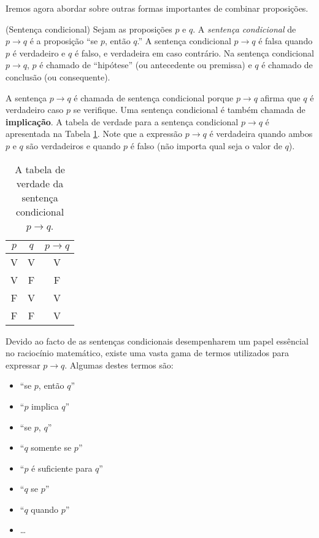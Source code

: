 Iremos agora abordar sobre outras formas importantes de combinar proposições.

\label{def15}
\begin{defn}
(Sentença condicional) Sejam as proposições $p$ e $q$. A \emph{sentença
condicional} de $p \to q$ é a proposição ``se $p$, então $q$.'' A sentença
condicional $p \to q$ é falsa quando $p$ é verdadeiro e $q$ é falso, e
verdadeira em caso contrário. Na sentença condicional $p \to q$, $p$ é chamado
de ``hipótese'' (ou antecedente ou premissa) e $q$ é chamado de conclusão (ou consequente).
\end{defn}

A sentença $p \to q$ é chamada de sentença condicional porque $p \to q$ afirma
que $q$ é verdadeiro caso $p$ se verifique. Uma sentença condicional é também
chamada de \textbf{implicação}. A tabela de verdade para a sentença condicional
$p \to q$ é apresentada na Tabela \ref{tabela:15}. Note que a expressão $p \to
q$ é verdadeira quando ambos $p$ e $q$ são verdadeiros e quando $p$ é falso
(não importa qual seja o valor de $q$).

\begin{table}[H]
\centering
\begin{tabular}{|c|c|c|}%
\toprule
\textbf{$p$} & \textbf{$q$} & \textbf{$p \to q$}\\ 
\midrule
V &	V & V\\
V &	F & F\\
F &	V & V\\
F &	F & V\\
\bottomrule%
\end{tabular}%
\caption{A tabela de verdade da sentença condicional $p \to q$.}
\label{tabela:15}
\end{table}


Devido ao facto de as sentenças condicionais desempenharem um papel
essêncial no raciocínio matemático, existe uma vasta gama de termos utilizados
para expressar $p \to q$. Algumas destes termos são:

\begin{itemize}
  \item ``se $p$, então $q$''
  \item ``$p$ implica $q$''
  \item ``se $p$, $q$''
  \item ``$q$ somente se $p$''
  \item ``$p$ é suficiente para $q$''
  \item ``$q$ se $p$''
  \item ``$q$ quando $p$''
  \item \ldots
\end{itemize}


